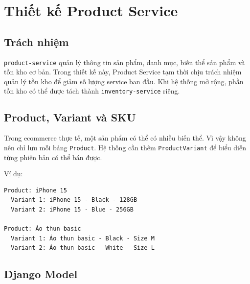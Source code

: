 \section{Thiết kế Product Service}

\subsection{Trách nhiệm}

\texttt{product-service} quản lý thông tin sản phẩm, danh mục, biến thể sản phẩm và tồn kho cơ bản. Trong thiết kế này, Product Service tạm thời chịu trách nhiệm quản lý tồn kho để giảm số lượng service ban đầu. Khi hệ thống mở rộng, phần tồn kho có thể được tách thành \texttt{inventory-service} riêng.

\subsection{Product, Variant và SKU}

Trong ecommerce thực tế, một sản phẩm có thể có nhiều biến thể. Vì vậy không nên chỉ lưu mỗi bảng \texttt{Product}. Hệ thống cần thêm \texttt{ProductVariant} để biểu diễn từng phiên bản có thể bán được.

Ví dụ:

\begin{verbatim}
Product: iPhone 15
  Variant 1: iPhone 15 - Black - 128GB
  Variant 2: iPhone 15 - Blue - 256GB

Product: Áo thun basic
  Variant 1: Áo thun basic - Black - Size M
  Variant 2: Áo thun basic - White - Size L
\end{verbatim}

\subsection{Django Model}

